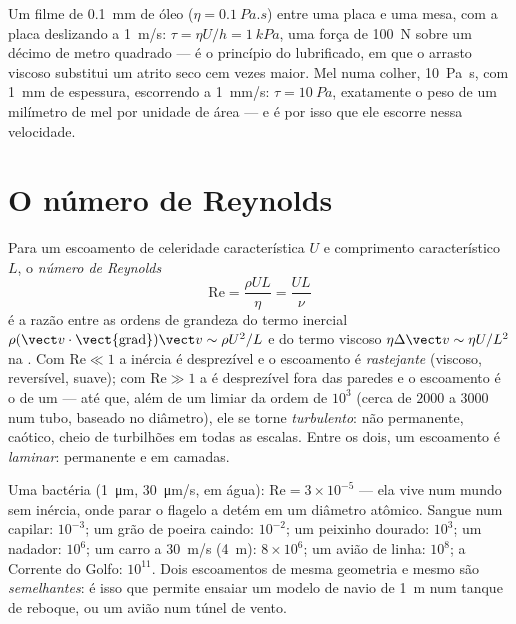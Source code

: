 \begin{example}\label{ex:b2:viscous-flows:table}
Um filme de \qty{0.1}{mm} de óleo ($\eta = \qty{0.1}{Pa.s}$) entre uma placa e uma
mesa, com a placa deslizando a \qty{1}{m/s}: $\tau = \eta U/h = \qty{1}{kPa}$, uma
força de \qty{100}{N} sobre um décimo de metro quadrado --- é o princípio do
 lubrificado, em que o arrasto viscoso substitui um atrito seco
cem vezes maior. Mel numa colher, \qty{10}{Pa.s}, com \qty{1}{mm} de espessura,
escorrendo a \qty{1}{mm/s}: $\tau = \qty{10}{Pa}$, exatamente o peso de um
milímetro de mel por unidade de área --- e é por isso que ele escorre nessa velocidade.
\end{example}

\section{O número de Reynolds}

\begin{definition}\label{def:b2:viscous-flows:reynolds}
Para um escoamento de celeridade característica $U$ e comprimento característico $L$, o \emph{número
de Reynolds}
\[
\mathrm{Re} = \frac{\rho UL}{\eta} = \frac{UL}{\nu}
\]
é a razão entre as ordens de grandeza do termo inercial
$\rho(\vect v\cdot\operatorname{\vect{grad}})\vect v \sim \rho U^2/L$ e do
termo viscoso $\eta\Delta\vect v \sim \eta U/L^2$ na . Com $\mathrm{Re} \ll 1$ a inércia é desprezível e o escoamento é
\emph{rastejante} (viscoso, reversível, suave); com $\mathrm{Re} \gg 1$
a  é desprezível fora das paredes e o escoamento é o de um
 --- até que, além de um limiar da ordem de $10^3$ (cerca de $2000$
a $3000$ num tubo, baseado no diâmetro), ele se torne \emph{turbulento}:
não permanente, caótico, cheio de turbilhões em todas as escalas. Entre os dois, um
escoamento é \emph{laminar}: permanente e em camadas.
\end{definition}

\begin{example}\label{ex:b2:viscous-flows:revalues}
Uma bactéria (\qty{1}{\micro m}, \qty{30}{\micro m/s}, em água): $\mathrm{Re} =
3 \times 10^{-5}$ --- ela vive num mundo sem inércia, onde parar
o flagelo a detém em um diâmetro atômico. Sangue num capilar:
$10^{-3}$; um grão de poeira caindo: $10^{-2}$; um peixinho dourado: $10^3$; um nadador:
$10^6$; um carro a \qty{30}{m/s} (\qty{4}{m}): $8 \times 10^6$; um avião de linha: $10^8$;
a Corrente do Golfo: $10^{11}$. Dois escoamentos de mesma geometria e mesmo
 são \emph{semelhantes}: é isso que permite ensaiar um modelo de navio de \qty{1}{m}
num tanque de reboque, ou um avião num túnel de vento.
\end{example}

